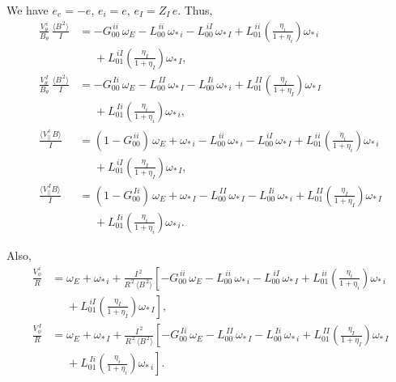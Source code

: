 \documentclass[12pt]{article}
\begin{document}
We have $e_e=-e$, $e_i=e$, $e_I= Z_I\,e$. 
Thus,
\begin{align}\label{vtnc}
\frac{V_\theta^{\,i}}{B_\theta}\,\frac{\langle B^{\,2}\rangle}{I} &= -G_{00}^{\,ii}\,\omega_E-L^{\,ii}_{00}\,\omega_{\ast\,i}-
L^{\,iI}_{00}\,\omega_{\ast\,I}+L^{\,ii}_{01}\left(\frac{\eta_i}{1+\eta_i}\right)\omega_{\ast\,i}\nonumber\\[0.5ex]\phantom{=}
&\phantom{=}+L^{\,iI}_{01}\left(\frac{\eta_I}{1+\eta_I}\right)\omega_{\ast\,I},\\[0.5ex]
\frac{V_\theta^{\,I}}{B_\theta}\,\frac{\langle B^{\,2}\rangle}{I} &= -G_{00}^{\,Ii}\,\omega_E-L^{\,II}_{00}\,\omega_{\ast\,I}-
L^{\,Ii}_{00}\,\omega_{\ast\,i}+L^{\,II}_{01}\left(\frac{\eta_I}{1+\eta_I}\right)\omega_{\ast\,I}\nonumber\\[0.5ex]\phantom{=}
&\phantom{=}+L^{\,Ii}_{01}\left(\frac{\eta_i}{1+\eta_i}\right)\omega_{\ast\,i},\\[0.5ex]
\frac{\langle V_\parallel^{\,i}\,B\rangle}{I} &=(1-G_{00}^{\,ii})\,\omega_E +\omega_{\ast\,i}-L^{\,ii}_{00}\,\omega_{\ast\,i}-
L^{\,iI}_{00}\,\omega_{\ast\,I}+L^{\,ii}_{01}\left(\frac{\eta_i}{1+\eta_i}\right)\omega_{\ast\,i}\nonumber\\[0.5ex]\phantom{=}
&\phantom{=}+L^{\,iI}_{01}\left(\frac{\eta_I}{1+\eta_I}\right)\omega_{\ast\,I},\\[0.5ex]
\frac{\langle V_\parallel^{\,I} B\rangle}{I} &=(1-G_{00}^{\,Ii})\, \omega_E +\omega_{\ast\,I}-L^{\,II}_{00}\,\omega_{\ast\,I}-
L^{\,Ii}_{00}\,\omega_{\ast\,i}+L^{\,II}_{01}\left(\frac{\eta_I}{1+\eta_I}\right)\omega_{\ast\,I}\nonumber\\[0.5ex]\phantom{=}
&\phantom{=}+L^{\,Ii}_{01}\left(\frac{\eta_i}{1+\eta_i}\right)\omega_{\ast\,i}.
\end{align}

Also,
\begin{align}
\frac{V_\phi^{\,i}}{R}&=\omega_E +\omega_{\ast\,i} +\frac{I^{\,2}}{R^{\,2}\,\langle B^{\,2}\rangle}\left[-G_{00}^{\,ii}\,\omega_E-L^{\,ii}_{00}\,\omega_{\ast\,i}-
L^{\,iI}_{00}\,\omega_{\ast\,I}+L^{\,ii}_{01}\left(\frac{\eta_i}{1+\eta_i}\right)\omega_{\ast\,i}\right.\nonumber\\[0.5ex]\phantom{=}
&\left.\phantom{=}+L^{\,iI}_{01}\left(\frac{\eta_I}{1+\eta_I}\right)\omega_{\ast\,I}\right],\\[0.5ex]
\frac{V_\phi^{\,I}}{R}&= \omega_E +\omega_{\ast\,I}+\frac{I^{\,2}}{R^{\,2}\,\langle B^{\,2}\rangle}\left[-G_{00}^{\,Ii}\,\omega_E-L^{\,II}_{00}\,\omega_{\ast\,I}-
L^{\,Ii}_{00}\,\omega_{\ast\,i}+L^{\,II}_{01}\left(\frac{\eta_I}{1+\eta_I}\right)\omega_{\ast\,I}\right.\nonumber\\[0.5ex]\phantom{=}
&\left.\phantom{=}+L^{\,Ii}_{01}\left(\frac{\eta_i}{1+\eta_i}\right)\omega_{\ast\,i}\right].
\end{align}
\end{document}

